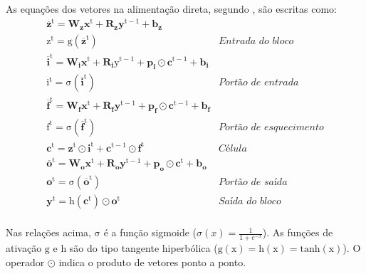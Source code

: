 As equações dos vetores na alimentação direta, segundo , são escritas como:
\begin{equation}
\begin{array}{lr}
\mathrm{\overline{\mathbf{z}}^t = \mathbf{W_z} \mathbf{x}^t + \mathbf{R_z} \mathbf{y}^{t-1}+\mathbf{b_z} 				    							}& 						\\
\mathrm{z^t = g(\overline{\mathbf{z}}^t)																												}& \textit{Entrada do bloco} \\ %
\mathrm{\overline{\mathbf{i}}^t = \mathbf{W_i} \mathbf{x}^t + \mathbf{R_i} y^{t-1} + \mathbf{p_i} \odot \mathbf{c}^{t-1} + \mathbf{b_i}				}& 						\\
\mathrm{i^t = \sigma(\overline{\mathbf{i}}^t) 																											}& \textit{Portão de entrada} 	\\ %
\mathrm{\overline{\mathbf{f}}^t = \mathbf{W_f} \mathbf{x}^t + \mathbf{R_f} \mathbf{y}^{t-1} + \mathbf{p_f} \odot \mathbf{c}^{t-1} + \mathbf{b_f}	}&						\\
\mathrm{f^t = \sigma(\overline{\mathbf{f}}^t) 																											}& \textit{Portão de esquecimento} \\ %
\mathrm{\mathbf{c}^t = \mathbf{z}^t \odot \mathbf{i}^{t} + \mathbf{c}^{t-1} \odot \mathbf{f}^t													}&\textit{Célula}			\\ %
\mathrm{\overline{\mathbf{o}}^t = \mathbf{W_o} \mathbf{x}^t + \mathbf{R_o} \mathbf{y}^{t-1} + \mathbf{p_o} \odot \mathbf{c}^{t} + \mathbf{b_o}  		}&						\\ 
\mathrm{\mathbf{o}^t = \sigma(\overline{\mathbf{o}}^t) 																									}& \textit{Portão de saída} \\	%
\mathrm{\mathbf{y}^t = h(\mathbf{c}^t)\odot \mathbf{o}^t																							}& \textit{Saída do bloco}\\		%
\end{array}
\end{equation}

Nas relações acima, $\mathrm{\sigma}$ é a função sigmoide ($\sigma(x)=\frac{1}{1+e^{-x}}$). As funções de ativação  $\mathrm{g}$ e $\mathrm{h}$ são do tipo tangente hiperbólica ($\mathrm{g(x)=h(x)=tanh(x)}$). O operador $\odot$ indica o produto de vetores ponto a ponto.

